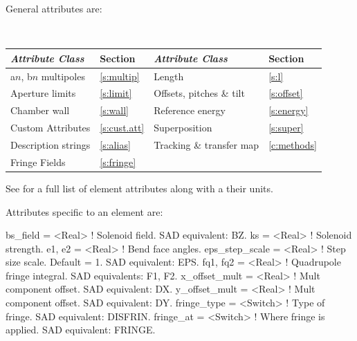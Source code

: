 {General  attributes are:
\begin{center}
\tt
\begin{tabular}{llll} \toprule
  {\sl Attribute Class}      & Section           & {\sl Attribute Class}      & Section         \\ \midrule
  a$n$, b$n$ multipoles      & \ref{s:multip}    & Length                     & \ref{s:l}       \\
  Aperture limits            & \ref{s:limit}     & Offsets, pitches \& tilt   & \ref{s:offset}  \\
  Chamber wall               & \ref{s:wall}      & Reference energy           & \ref{s:energy}  \\ 
  Custom Attributes          & \ref{s:cust.att}  & Superposition              & \ref{s:super}   \\
  Description strings        & \ref{s:alias}     & Tracking \& transfer map   & \ref{c:methods} \\ 
  Fringe Fields              & \ref{s:fringe}    &                            &                 \\
  \bottomrule
\end{tabular}
\end{center}
\toffset
See  for a full list of element attributes along with a their units.

Attributes specific to an  element are:
\begin{example}
  bs_field        = <Real>    ! Solenoid field. SAD equivalent: BZ.
  ks              = <Real>    ! Solenoid strength. 
  e1, e2          = <Real>    ! Bend face angles.
  eps_step_scale  = <Real>    ! Step size scale. Default = 1. SAD equivalent: EPS.
  fq1, fq2        = <Real>    ! Quadrupole fringe integral. SAD equivalents: F1, F2.
  x_offset_mult   = <Real>    ! Mult component offset. SAD equivalent: DX.
  y_offset_mult   = <Real>    ! Mult component offset. SAD equivalent: DY.
  fringe_type     = <Switch>  ! Type of fringe. SAD equivalent: DISFRIN.
  fringe_at       = <Switch>  ! Where fringe is applied. SAD equivalent: FRINGE.
\end{example}


}
